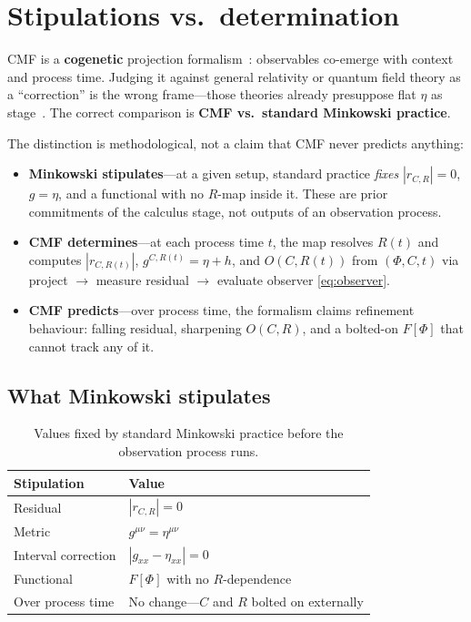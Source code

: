 \documentclass[11pt,a4paper]{article}
\newcommand{\Ph}{\Phi}
\begin{document}
\section{Stipulations vs.\ determination}

CMF is a \textbf{cogenetic} projection formalism~\cite{petrik2026cogenesis}: observables co-emerge with context and process time. Judging it against general relativity or quantum field theory as a ``correction'' is the wrong frame---those theories already presuppose flat $\eta$ as stage~\cite{petrik2025omqg}. The correct comparison is \textbf{CMF vs.\ standard Minkowski practice}.

The distinction is methodological, not a claim that CMF never predicts anything:
\begin{itemize}[noitemsep]
  \item \textbf{Minkowski stipulates}---at a given setup, standard practice \emph{fixes} $|r_{C,R}|=0$, $g=\eta$, and a functional with no $R$-map inside it. These are prior commitments of the calculus stage, not outputs of an observation process.
  \item \textbf{CMF determines}---at each process time $t$, the map resolves $R(t)$ and computes $|r_{C,R(t)}|$, $g^{C,R(t)}=\eta+h$, and $O(C,R(t))$ from $(\Ph,C,t)$ via project $\to$ measure residual $\to$ evaluate observer \eqref{eq:observer}.
  \item \textbf{CMF predicts}---over process time, the formalism claims refinement behaviour: falling residual, sharpening $O(C,R)$, and a bolted-on $F[\Ph]$ that cannot track any of it.
\end{itemize}

\subsection{What Minkowski stipulates}

\begin{table}[h]
  \centering
  \caption{Values fixed by standard Minkowski practice before the observation process runs.}
  \label{tab:stipulations}
  \begin{tabular}{@{}ll@{}}
    \toprule
    Stipulation & Value \\
    \midrule
    Residual & $|r_{C,R}| = 0$ \\
    Metric & $g^{\mu\nu} = \eta^{\mu\nu}$ \\
    Interval correction & $|g_{xx}-\eta_{xx}| = 0$ \\
    Functional & $F[\Ph]$ with no $R$-dependence \\
    Over process time & No change---$C$ and $R$ bolted on externally \\
    \bottomrule
  \end{tabular}
\end{table}
\end{document}
